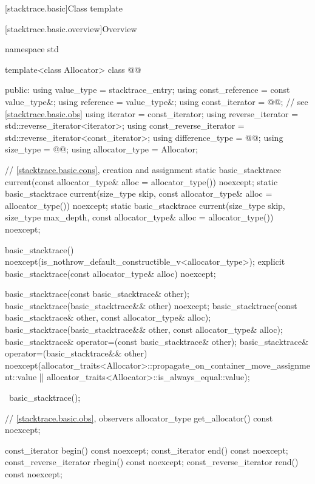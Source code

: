 [stacktrace.basic]{Class template }

[stacktrace.basic.overview]{Overview}

\begin{codeblock}
namespace std {
  template<class Allocator>
  class @@ {
  public:
    using value_type = stacktrace_entry;
    using const_reference = const value_type&;
    using reference = value_type&;
    using const_iterator = @@;  // see \ref{stacktrace.basic.obs}
    using iterator = const_iterator;
    using reverse_iterator = std::reverse_iterator<iterator>;
    using const_reverse_iterator = std::reverse_iterator<const_iterator>;
    using difference_type = @@;
    using size_type = @@;
    using allocator_type = Allocator;

    // \ref{stacktrace.basic.cons}, creation and assignment
    static basic_stacktrace current(const allocator_type& alloc = allocator_type()) noexcept;
    static basic_stacktrace current(size_type skip,
                                    const allocator_type& alloc = allocator_type()) noexcept;
    static basic_stacktrace current(size_type skip, size_type max_depth,
                                    const allocator_type& alloc = allocator_type()) noexcept;

    basic_stacktrace() noexcept(is_nothrow_default_constructible_v<allocator_type>);
    explicit basic_stacktrace(const allocator_type& alloc) noexcept;

    basic_stacktrace(const basic_stacktrace& other);
    basic_stacktrace(basic_stacktrace&& other) noexcept;
    basic_stacktrace(const basic_stacktrace& other, const allocator_type& alloc);
    basic_stacktrace(basic_stacktrace&& other, const allocator_type& alloc);
    basic_stacktrace& operator=(const basic_stacktrace& other);
    basic_stacktrace& operator=(basic_stacktrace&& other)
      noexcept(allocator_traits<Allocator>::propagate_on_container_move_assignment::value ||
        allocator_traits<Allocator>::is_always_equal::value);

    ~basic_stacktrace();

    // \ref{stacktrace.basic.obs}, observers
    allocator_type get_allocator() const noexcept;

    const_iterator begin() const noexcept;
    const_iterator end() const noexcept;
    const_reverse_iterator rbegin() const noexcept;
    const_reverse_iterator rend() const noexcept;

}}
\end{codeblock}
